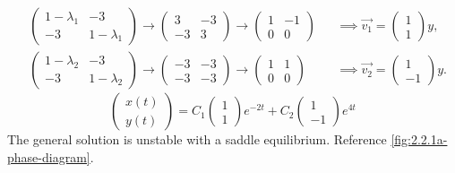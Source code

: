 \documentclass[12pt]{article}
\begin{document}
\begin{equation*}
  \begin{aligned}
    &\begin{pmatrix}1-\lambda_1&-3\\-3&1-\lambda_1\end{pmatrix}
    \rightarrow\begin{pmatrix}3&-3\\-3&3\end{pmatrix}
    \rightarrow\begin{pmatrix}1&-1\\0&0\end{pmatrix}
    &&\implies \vec{v_1} = \begin{pmatrix}1\\1\end{pmatrix}y, \\
    &\begin{pmatrix}1-\lambda_2&-3\\-3&1-\lambda_2\end{pmatrix}
    \rightarrow\begin{pmatrix}-3&-3\\-3&-3\end{pmatrix}
    \rightarrow\begin{pmatrix}1&1\\0&0\end{pmatrix}
    &&\implies \vec{v_2} = \begin{pmatrix}1\\-1\end{pmatrix}y.
  \end{aligned}
\end{equation*}
$$\boxed{\begin{pmatrix}x(t)\\y(t)\end{pmatrix}=C_1\begin{pmatrix}1\\1\end{pmatrix}e^{-2t}+C_2\begin{pmatrix}1\\-1\end{pmatrix}e^{4t}}$$
The general solution is unstable with a saddle equilibrium. Reference
\cref{fig:2.2.1a-phase-diagram}.
\end{document}
